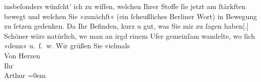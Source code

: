 \begin{ledgroupsized}[t]{13cm}
               insbeſonders wünſcht’ ich zu wiſſen, welchen Ihrer Stoffe ſie jetzt am ſtärkſten
               bewegt und welchen Sie »zunächſt« (ein ſcheußliches Berliner Wort) in Bewegung zu ſetzen gedenken. Da{\geminationn} Ihr Befinden, kurz u gut, was Sie mir \introOben{}zu\introOben{} ſagen haben{[}.{]} Schöner wärs natürlich,
                  we{\geminationn}{ }{\pb}man an irgd einem Ufer gemeinſam wandelte,
               wo ſich »denn« u. ſ. w.\pend
           \pstart
           Wir grüßen Sie vielmals
               {\\[\baselineskip]}Von Herzen {\\[\baselineskip]}Ihr {\\[\baselineskip]}\spacefill\mbox{Arthur}\pend
           \leftskip=0em{}
         
         \endnumbering{}\end{ledgroupsized}  \newcommand{\dateiname}{L03009}\newcommand{\titel}{Arthur Schnitzler an Felix Salten, 5. 8. 1907}\newcommand{\editorInnen}{Martin Anton Müller und Laura Untner}
      